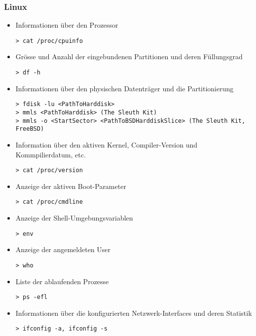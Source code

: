 \subsubsection{Linux}
\begin{itemize}
\item Informationen über den Prozessor 
\begin{lstlisting}
> cat /proc/cpuinfo
\end{lstlisting}

\item Grösse und Anzahl der eingebundenen Partitionen und deren Füllungsgrad 
\begin{lstlisting}
> df -h
\end{lstlisting}

\item  Informationen über den physischen Datenträger und die Partitionierung
\begin{lstlisting}
> fdisk -lu <PathToHarddisk>
> mmls <PathToHarddisk> (The Sleuth Kit)
> mmls -o <StartSector> <PathToBSDHarddiskSlice> (The Sleuth Kit, FreeBSD)
\end{lstlisting}

\item  Information über den aktiven Kernel, Compiler-Version und Kommpilierdatum, etc.
\begin{lstlisting}
> cat /proc/version
\end{lstlisting}

\item  Anzeige der aktiven Boot-Parameter
\begin{lstlisting}
> cat /proc/cmdline
\end{lstlisting}


\item  Anzeige der Shell-Umgebungsvariablen
\begin{lstlisting}
> env
\end{lstlisting}

\item  Anzeige der angemeldeten User
\begin{lstlisting}
> who
\end{lstlisting}

\item  Liste der ablaufenden Prozesse
\begin{lstlisting}
> ps -efl
\end{lstlisting}

\item  Informationen über die konfigurierten Netzwerk-Interfaces und deren Statistik 
\begin{lstlisting}
> ifconfig -a, ifconfig -s
\end{lstlisting}


\end{itemize}
